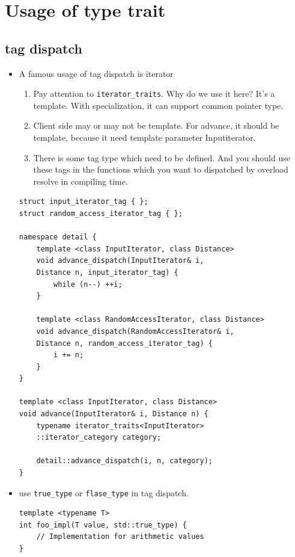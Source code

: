 \documentclass[a4paper,11pt,twoside]{book}
\begin{document}
\section{Usage of type trait}

\subsection{tag dispatch}
\begin{itemize}
	\item A famous usage of tag dispatch is iterator 
	\begin{enumerate}
		\item Pay attention to \texttt{iterator\_traits}. Why do we use it here? It's a template. With specialization, it can support common pointer type.
		
		\item Client side may or may not be template. For advance, it should be template, because it need template parameter Inputiterator.
		
		\item There is some tag type which need to be defined. And you should use these tags in the functions which you want to dispatched by overload resolve in compiling time. 
	\end{enumerate}
\begin{lstlisting}[numbers=none]
struct input_iterator_tag { };
struct random_access_iterator_tag { };

namespace detail {
	template <class InputIterator, class Distance>
	void advance_dispatch(InputIterator& i, 
	Distance n, input_iterator_tag) {
		while (n--) ++i;
	}
	
	template <class RandomAccessIterator, class Distance>
	void advance_dispatch(RandomAccessIterator& i,
	Distance n, random_access_iterator_tag) {
		i += n;
	}
}

template <class InputIterator, class Distance>
void advance(InputIterator& i, Distance n) {
	typename iterator_traits<InputIterator>
	::iterator_category category;
	
	detail::advance_dispatch(i, n, category);
}	
\end{lstlisting}	

    \item use \texttt{true\_type} or \texttt{flase\_type} in tag dispatch.
\begin{lstlisting}[numbers=none]
template <typename T>
int foo_impl(T value, std::true_type) {
	// Implementation for arithmetic values
}


\end{lstlisting}
\end{itemize}
\end{document}
